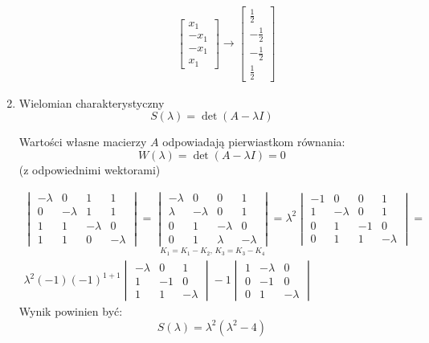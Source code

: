 \begin{example*}
\begin{enumerate}[label=\Roman*.]
\begin{itemize}
\begin{multicols}{2}
\begin{align*}
&\begin{bmatrix}
x_1\\-x_1\\-x_1\\x_1
\end{bmatrix}\rightarrow
\begin{bmatrix}
\frac{1}{2}\\-\frac{1}{2}\\-\frac{1}{2}\\\frac{1}{2}
\end{bmatrix}
\end{align*}
\end{multicols}
\end{itemize}

\item Wielomian charakterystyczny
$$S(\lambda )=\det (A-\lambda I)$$
\begin{fact*}
Wartości własne macierzy $A$ odpowiadają pierwiastkom równania:
$$W(\lambda )=\det (A-\lambda I)=0$$
(z odpowiednimi wektorami)
\end{fact*}
\begin{align*}
\begin{vmatrix}
-\lambda &0&1&1\\
0&-\lambda &1&1\\
1&1&-\lambda &0\\
1&1&0&-\lambda
\end{vmatrix}=\underset{K_1 = K_1-K_2,\, K_3=K_3-K_4}{\begin{vmatrix}
-\lambda &0&0&1\\
\lambda&-\lambda &0&1\\
0&1&-\lambda &0\\
0&1&\lambda &-\lambda
\end{vmatrix}}=\lambda ^2 \begin{vmatrix}
-1 &0&0&1\\
1&-\lambda &0&1\\
0&1&-1 &0\\
0&1&1 &-\lambda
\end{vmatrix}=\\
\lambda ^2(-1)(-1)^{1+1}\begin{vmatrix}
-\lambda &0 &1\\
1 &-1 & 0 \\
1& 1& -\lambda
\end{vmatrix}-1\begin{vmatrix}
1 &-\lambda &0\\
0 &-1 & 0 \\
0& 1& -\lambda
\end{vmatrix}
\end{align*}
Wynik powinien być: $$S(\lambda )=\lambda ^2 (\lambda ^2 -4)$$
\end{enumerate}
\end{example*}

